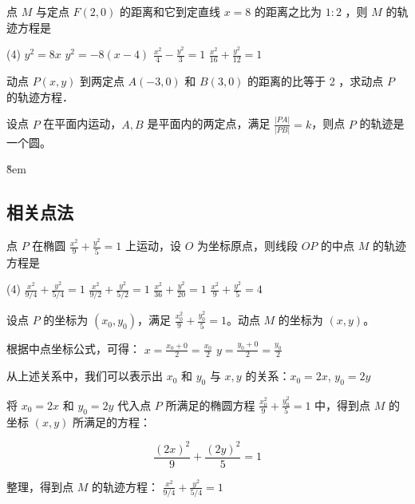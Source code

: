 \vspace{1em}

\begin{problem}
点 $M$ 与定点 $F(2,0)$ 的距离和它到定直线 $x=8$ 的距离之比为 $1: 2$ ，则 $M$ 的轨迹方程是

\begin{tasks}(4)
    \task $y^2=8 x$
    \task $y^2=-8(x-4)$
    \task $\frac{x^2}{4}-\frac{y^2}{3}=1$
    \task $\frac{x^2}{16}+\frac{y^2}{12}=1$
\end{tasks}
\end{problem}

\begin{problem}
动点 $P(x, y)$ 到两定点 $A(-3,0)$ 和 $B(3,0)$ 的距离的比等于 2 ，求动点 $P$ 的轨迹方程．
\end{problem}

\begin{theorem}[阿氏圆]
    设点 $P$ 在平面内运动，$A, B$ 是平面内的两定点，满足 $\frac{|PA|}{|PB|} = k$，则点 $P$ 的轨迹是一个圆。
\end{theorem}

\v{8em}

\subsection{相关点法}

\begin{example}
    点 $P$ 在椭圆 $\frac{x^2}{9} + \frac{y^2}{5} = 1$ 上运动，设 $O$ 为坐标原点，则线段 $OP$ 的中点 $M$ 的轨迹方程是
    \begin{tasks}(4)
        \task $\frac{x^2}{9/4} + \frac{y^2}{5/4} = 1$
        \task $\frac{x^2}{9/2} + \frac{y^2}{5/2} = 1$
        \task $\frac{x^2}{36} + \frac{y^2}{20} = 1$
        \task $\frac{x^2}{9} + \frac{y^2}{5} = 4$
    \end{tasks}
\end{example}
\begin{solution}
    设点 $P$ 的坐标为 $(x_0, y_0)$，满足 $\frac{x_0^2}{9} + \frac{y_0^2}{5} = 1$。动点 $M$ 的坐标为 $(x, y)$。

    根据中点坐标公式，可得：
    $x = \frac{x_0+0}{2} = \frac{x_0}{2}$
    $y = \frac{y_0+0}{2} = \frac{y_0}{2}$

    从上述关系中，我们可以表示出 $x_0$ 和 $y_0$ 与 $x, y$ 的关系：$x_0 = 2x$, $y_0 = 2y$

    将 $x_0 = 2x$ 和 $y_0 = 2y$ 代入点 $P$ 所满足的椭圆方程 $\frac{x_0^2}{9} + \frac{y_0^2}{5} = 1$ 中，得到点 $M$ 的坐标 $(x,y)$ 所满足的方程：

    $$\frac{(2x)^2}{9} + \frac{(2y)^2}{5} = 1$$

    整理，得到点 $M$ 的轨迹方程：
    $\frac{x^2}{9/4} + \frac{y^2}{5/4} = 1$
\end{solution}

